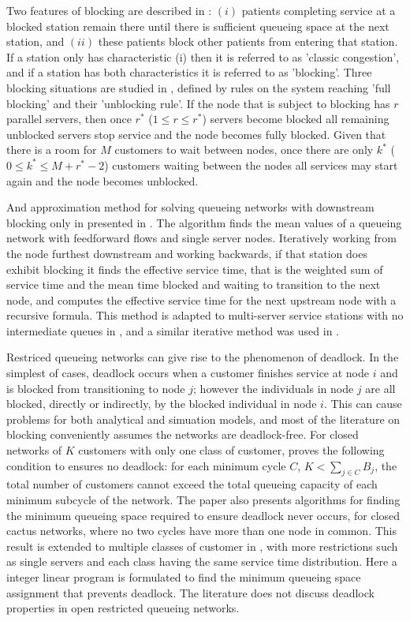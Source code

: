 \documentclass{article}
\begin{document}
Two features of blocking are described in \cite{koizumietal05}: $(i)$ patients completing service at a blocked station remain there until there is sufficient queueing space at the next station, and $(ii)$ these patients block other patients from entering that station.
If a station only has characteristic (i) then it is referred to as 'classic congestion', and if a station has both characteristics it is referred to as 'blocking'.
Three blocking situations are studied in \cite{latoucheneuts80}, defined by rules on the system reaching 'full blocking' and their 'unblocking rule'.
If the node that is subject to blocking has $r$ parallel servers, then once $r^*$ ($1\leq r\leq r^*$) servers become blocked all remaining unblocked servers stop service and the node becomes fully blocked.
Given that there is a room for $M$ customers to wait between nodes, once there are only $k^*$ ($0\leq k^*\leq M+r^*-2$) customers waiting between the nodes all services may start again and the node becomes unblocked.

And approximation method for solving queueing networks with downstream blocking only in presented in \cite{takahashi80}.
The algorithm finds the mean values of a queueing network with feedforward flows and single server nodes.
Iteratively working from the node furthest downstream and working backwards, if that station does exhibit blocking it finds the effective service time, that is the weighted sum of service time and the mean time blocked and waiting to transition to the next node, and computes the effective service time for the next upstream node with a recursive formula.
This method is adapted to multi-server service stations with no intermediate queues in \cite{koizumietal05}, and a similar iterative method was used in \cite{korporaaletal00}.

Restriced queueing networks can give rise to the phenomenon of deadlock.
In the simplest of cases, deadlock occurs when a customer finishes service at node $i$ and is blocked from transitioning to node $j$; however the individuals in node $j$ are all blocked, directly or indirectly, by the blocked individual in node $i$.
This can cause problems for both analytical and simuation models, and most of the literature on blocking conveniently assumes the networks are deadlock-free.
For closed networks of $K$ customers with only one class of customer, \cite{kunduakyildiz89} proves the following condition to ensures no deadlock: for each minimum cycle $C$, $K < \sum_{j\in C} B_j$, the total number of customers cannot exceed the total queueing capacity of each minimum subcycle of the network.
The paper also presents algorithms for finding the minimum queueing space required to ensure deadlock never occurs, for closed cactus networks, where no two cycles have more than one node in common.
This result is extended to multiple classes of customer in \cite{liebeherrakyildiz95}, with more restrictions such as single servers and each class having the same service time distribution.
Here a integer linear program is formulated to find the minimum queueing space assignment that prevents deadlock.
The literature does not discuss deadlock properties in open restricted queueing networks.
\end{document}
